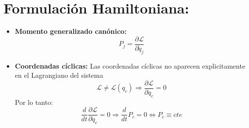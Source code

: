 \documentclass[14pt]{extarticle}
\newcommand{\Lagr}{\mathscr{L}}
\newcommand{\ddt}{\frac{d}{dt}}
\begin{document}
	\section{Formulación Hamiltoniana:}

		\begin{itemize}
			\item{ \textbf{Momento generalizado canónico: }
			\begin{equation}
				P_j = \frac{\partial \Lagr}{\partial \dot{q}_j}
			\end{equation}
			}

			\item{ \textbf{Coordenadas cíclicas: }
			Las coordenadas cíclicas no aparecen explicitamente en el Lagrangiano del sistema
			\begin{equation}
				\Lagr \neq \Lagr(q_c) \Longrightarrow \frac{\partial \Lagr}{\partial q_c} = 0
			\end{equation}
			Por lo tanto:
			\begin{equation}
				\ddt \frac{\partial \Lagr}{\partial \dot{q}_c} = 0 \Rightarrow \ddt P_c = 0 \Longleftrightarrow P_c \equiv cte
			\end{equation}

			}
		\end{itemize}
\end{document}
